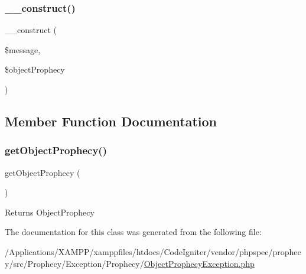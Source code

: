 \subsubsection{\texorpdfstring{\+\_\+\+\_\+construct()}{\_\_construct()}}
{\footnotesize\ttfamily \+\_\+\+\_\+construct (\begin{DoxyParamCaption}\item[{}]{\$message,  }\item[{\mbox{\hyperlink{class_prophecy_1_1_prophecy_1_1_object_prophecy}{Object\+Prophecy}}}]{\$object\+Prophecy }\end{DoxyParamCaption})}



\subsection{Member Function Documentation}
\mbox{\label{class_prophecy_1_1_exception_1_1_prophecy_1_1_object_prophecy_exception_a1cff2ecad65e616019de966935f0fe94}} 
\subsubsection{\texorpdfstring{get\+Object\+Prophecy()}{getObjectProphecy()}}
{\footnotesize\ttfamily get\+Object\+Prophecy (\begin{DoxyParamCaption}{ }\end{DoxyParamCaption})}

\begin{DoxyReturn}{Returns}
Object\+Prophecy 
\end{DoxyReturn}


The documentation for this class was generated from the following file\+:\begin{DoxyCompactItemize}
\item 
/\+Applications/\+X\+A\+M\+P\+P/xamppfiles/htdocs/\+Code\+Igniter/vendor/phpspec/prophecy/src/\+Prophecy/\+Exception/\+Prophecy/\mbox{\hyperlink{_object_prophecy_exception_8php}{Object\+Prophecy\+Exception.\+php}}\end{DoxyCompactItemize}
